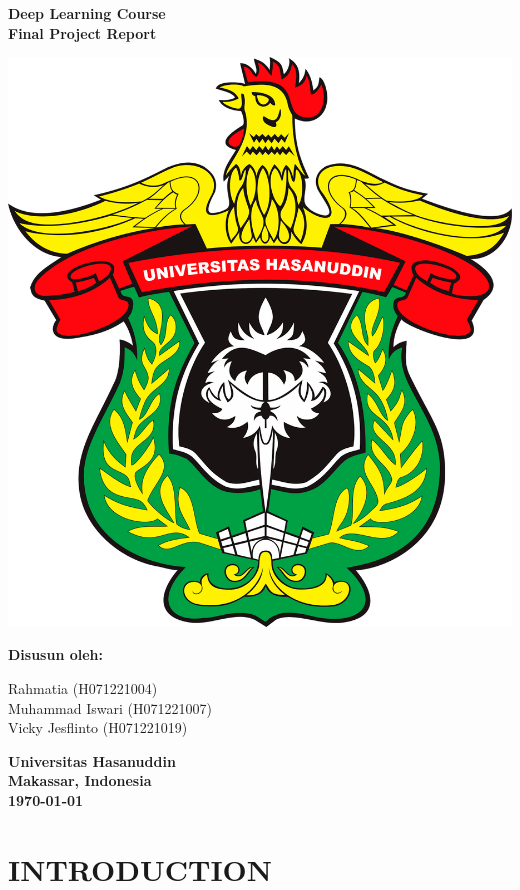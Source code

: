 \documentclass[12pt,a4paper]{article}
\begin{document}
\begin{titlepage}
    \centering
    {\Large\textbf{Deep Learning Course \\ Final Project Report}\par} %
    \vspace{2cm} %
    \includegraphics[width=0.5\linewidth]{Images/Logo_UH.png}\par %
    \vspace{2cm} %
    \textbf{Disusun oleh:}\\[0.5cm]
    {\large
    Rahmatia (H071221004)\\ 
    Muhammad Iswari (H071221007)\\ 
    Vicky Jesflinto (H071221019)\par}
    \vspace{1cm} %

    \vfill

    \textbf{Universitas Hasanuddin}\\
    \textbf{Makassar, Indonesia}\\[0.5cm]
    \textbf{\today}
\end{titlepage}

\normalsize  %
\tableofcontents
\newpage

\section{INTRODUCTION}
\end{document}

